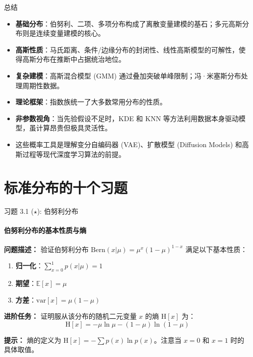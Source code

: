 \documentclass[12pt, aspectratio=169]{beamer}
\begin{document}
\begin{frame}{总结}
    \begin{itemize}
        \item \textbf{基础分布}：伯努利、二项、多项分布构成了离散变量建模的基石；多元高斯分布则是连续变量建模的核心。
        \item \textbf{高斯性质}：马氏距离、条件/边缘分布的封闭性、线性高斯模型的可解性，使得高斯分布在推断中占据统治地位。
        \item \textbf{复杂建模}：高斯混合模型 (GMM) 通过叠加突破单峰限制；冯·米塞斯分布处理周期性数据。
        \item \textbf{理论框架}：指数族统一了大多数常用分布的性质。
        \item \textbf{非参数视角}：当先验假设不足时，KDE 和 KNN 等方法利用数据本身驱动模型，虽计算昂贵但极具灵活性。
        \item 这些概率工具是理解变分自编码器 (VAE)、扩散模型 (Diffusion Models) 和高斯过程等现代深度学习算法的前提。
    \end{itemize}
\end{frame}

\section{标准分布的十个习题}

\begin{frame}{习题 3.1 ($\star$): 伯努利分布}
    \framesubtitle{伯努利分布的基本性质与熵}
    
    \textbf{问题描述：}
    验证伯努利分布 $\textrm{Bern}(x|\mu)=\mu^x(1-\mu)^{1-x}$ 满足以下基本性质：
    \begin{enumerate}
        \item \textbf{归一化}：$\displaystyle \sum_{x=0}^{1} p(x|\mu) = 1$
        \item \textbf{期望}：$\displaystyle \mathbb{E}[x] = \mu$
        \item \textbf{方差}：$\displaystyle \textrm{var}[x] = \mu(1-\mu)$
    \end{enumerate}
    
    \textbf{进阶任务：}
    证明服从该分布的随机二元变量 $x$ 的熵 $\mathrm{H}[x]$ 为：
    \begin{equation*}
        \mathrm{H}[x] = -\mu \ln \mu - (1-\mu) \ln(1-\mu)
    \end{equation*}
    
    \textbf{提示：}
    熵的定义为 $\mathrm{H}[x] = -\sum p(x) \ln p(x)$。注意当 $x=0$ 和 $x=1$ 时的具体取值。
    
\end{frame}
\end{document}
